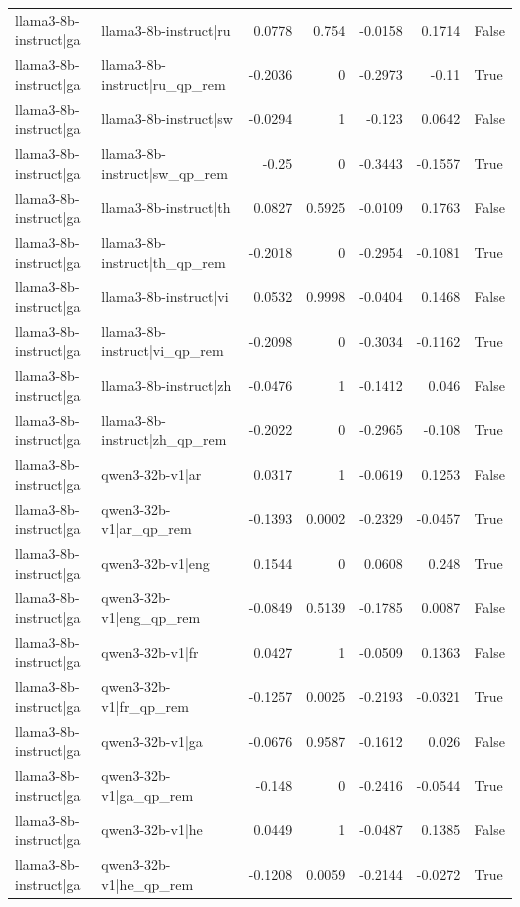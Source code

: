 \begin{table}
\begin{tabular}{l l r r r r l}
llama3-8b-instruct|ga & llama3-8b-instruct|ru & 0.0778 & 0.754 & -0.0158 & 0.1714 & False \\
llama3-8b-instruct|ga & llama3-8b-instruct|ru_qp_rem & -0.2036 & 0 & -0.2973 & -0.11 & True \\
llama3-8b-instruct|ga & llama3-8b-instruct|sw & -0.0294 & 1 & -0.123 & 0.0642 & False \\
llama3-8b-instruct|ga & llama3-8b-instruct|sw_qp_rem & -0.25 & 0 & -0.3443 & -0.1557 & True \\
llama3-8b-instruct|ga & llama3-8b-instruct|th & 0.0827 & 0.5925 & -0.0109 & 0.1763 & False \\
llama3-8b-instruct|ga & llama3-8b-instruct|th_qp_rem & -0.2018 & 0 & -0.2954 & -0.1081 & True \\
llama3-8b-instruct|ga & llama3-8b-instruct|vi & 0.0532 & 0.9998 & -0.0404 & 0.1468 & False \\
llama3-8b-instruct|ga & llama3-8b-instruct|vi_qp_rem & -0.2098 & 0 & -0.3034 & -0.1162 & True \\
llama3-8b-instruct|ga & llama3-8b-instruct|zh & -0.0476 & 1 & -0.1412 & 0.046 & False \\
llama3-8b-instruct|ga & llama3-8b-instruct|zh_qp_rem & -0.2022 & 0 & -0.2965 & -0.108 & True \\
llama3-8b-instruct|ga & qwen3-32b-v1|ar & 0.0317 & 1 & -0.0619 & 0.1253 & False \\
llama3-8b-instruct|ga & qwen3-32b-v1|ar_qp_rem & -0.1393 & 0.0002 & -0.2329 & -0.0457 & True \\
llama3-8b-instruct|ga & qwen3-32b-v1|eng & 0.1544 & 0 & 0.0608 & 0.248 & True \\
llama3-8b-instruct|ga & qwen3-32b-v1|eng_qp_rem & -0.0849 & 0.5139 & -0.1785 & 0.0087 & False \\
llama3-8b-instruct|ga & qwen3-32b-v1|fr & 0.0427 & 1 & -0.0509 & 0.1363 & False \\
llama3-8b-instruct|ga & qwen3-32b-v1|fr_qp_rem & -0.1257 & 0.0025 & -0.2193 & -0.0321 & True \\
llama3-8b-instruct|ga & qwen3-32b-v1|ga & -0.0676 & 0.9587 & -0.1612 & 0.026 & False \\
llama3-8b-instruct|ga & qwen3-32b-v1|ga_qp_rem & -0.148 & 0 & -0.2416 & -0.0544 & True \\
llama3-8b-instruct|ga & qwen3-32b-v1|he & 0.0449 & 1 & -0.0487 & 0.1385 & False \\
llama3-8b-instruct|ga & qwen3-32b-v1|he_qp_rem & -0.1208 & 0.0059 & -0.2144 & -0.0272 & True \\

\end{tabular}
\end{table}
